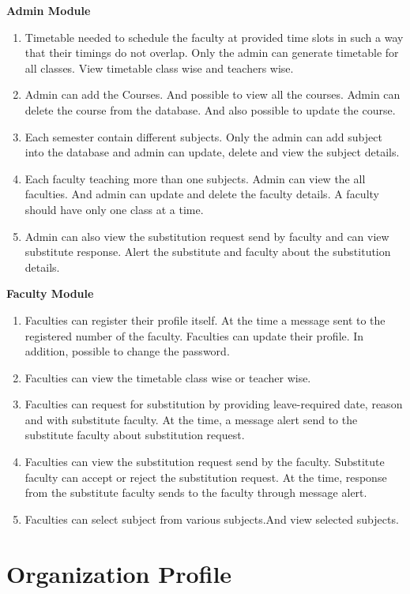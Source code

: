{\bf Admin Module}
\begin{enumerate}
\item Timetable needed to schedule the faculty at provided time slots in such a way that their timings do not overlap. Only the admin can generate timetable for all classes. View timetable class wise and teachers wise.
\item Admin can add the Courses. And possible to view all the courses. Admin can delete the course from the database. And also possible to update the course.
\item Each semester contain different subjects. Only the admin can add subject into the database and admin can update, delete and view the subject details. 
\item Each faculty teaching more than one subjects. Admin can view the all faculties. And admin can update and delete the faculty details. A faculty should have only one class at a time.
\item Admin can also view the substitution request send by faculty and can view substitute response. Alert the substitute and faculty about the substitution details.

\end{enumerate}

{\bf Faculty Module}
\begin{enumerate}
\item Faculties can register their profile itself. At the time a message sent to the registered number of the faculty. Faculties can update their profile. In addition, possible to change the password.
\item Faculties can view the timetable class wise or teacher wise.
\item Faculties can request for substitution by providing leave-required date, reason and with substitute faculty. At the time, a message alert send to the substitute faculty about substitution request.
\item Faculties can view the substitution request send by the faculty. Substitute faculty can accept or reject the substitution request. At the time, response from the substitute faculty sends to the faculty through message alert.
\item Faculties can select subject from various subjects.And view selected subjects.

\end{enumerate}

\newpage
%
\section{Organization Profile}

